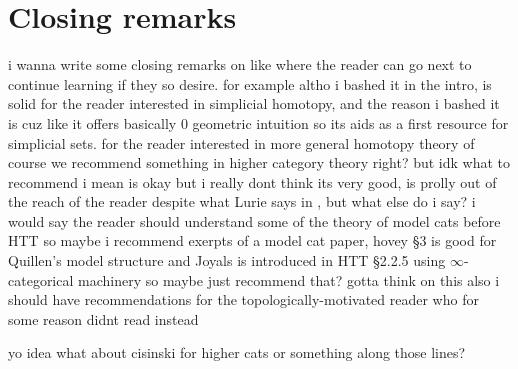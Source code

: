 \section{Closing remarks}

i wanna write some closing remarks on like where the reader can go next to continue learning if they so desire. for example altho i bashed it in the intro, \cite{gj} is solid for the reader interested in simplicial homotopy, and the reason i bashed it is cuz like it offers basically 0 geometric intuition so its aids as a first resource for simplicial sets. for the reader interested in more general homotopy theory of course we recommend something in higher category theory right? but idk what to recommend i mean \cite{cht} is okay but i really dont think its very good, \cite{htt} is prolly out of the reach of the reader despite what Lurie says in \cite{lurie-stackoverflow}, but what else do i say? i would say the reader should understand some of the theory of model cats before HTT so maybe i recommend exerpts of a model cat paper, hovey \S3 is good for Quillen's model structure and Joyals is introduced in HTT \S2.2.5 using $\infty $-categorical machinery so maybe just recommend that? gotta think on this also i should have recommendations for the topologically-motivated reader who for some reason didnt read \cite{fried} instead

yo idea what about cisinski for higher cats or something along those lines?
